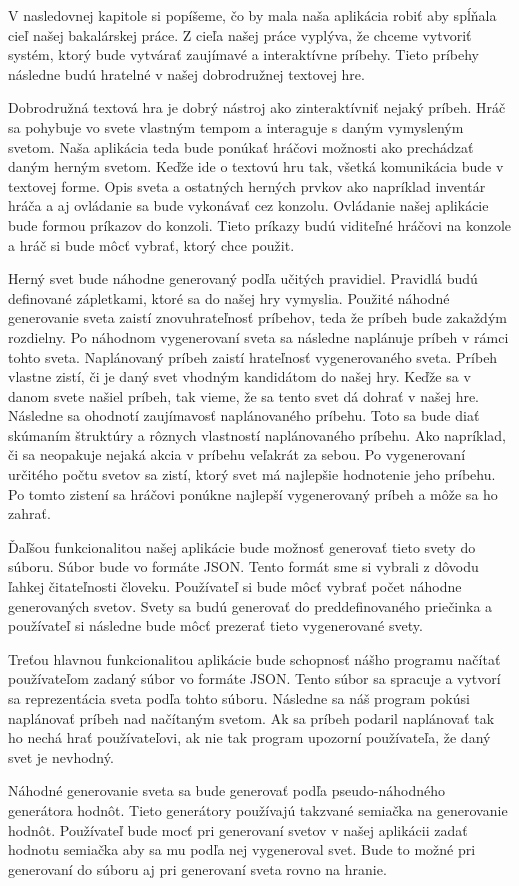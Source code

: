 V nasledovnej kapitole si popíšeme, čo by mala naša aplikácia robiť aby spĺňala cieľ našej bakalárskej práce. Z cieľa našej práce vyplýva, že chceme vytvoriť systém, ktorý bude vytvárať zaujímavé a interaktívne príbehy. Tieto príbehy následne budú hratelné v našej dobrodružnej textovej hre.\par
Dobrodružná textová hra je dobrý nástroj ako zinteraktívniť nejaký príbeh. Hráč sa pohybuje vo svete vlastným tempom a interaguje s daným vymysleným svetom. Naša aplikácia teda bude ponúkať hráčovi možnosti ako prechádzať daným herným svetom. Keďže ide o textovú hru tak, všetká komunikácia bude v textovej forme. Opis sveta a ostatných herných prvkov ako napríklad inventár hráča a aj ovládanie sa bude vykonávať cez konzolu. Ovládanie našej aplikácie bude formou príkazov do konzoli. Tieto príkazy budú viditeľné hráčovi na konzole a hráč si bude môcť vybrať, ktorý chce použit.\par
Herný svet bude náhodne generovaný podľa učitých pravidiel. Pravidlá budú definované zápletkami, ktoré sa do našej hry vymyslia. Použité náhodné generovanie sveta zaistí znovuhrateľnosť príbehov, teda že príbeh bude zakaždým rozdielny. Po náhodnom vygenerovaní sveta sa následne naplánuje príbeh v rámci tohto sveta. Naplánovaný príbeh zaistí hrateľnosť vygenerovaného sveta. Príbeh vlastne zistí, či je daný svet vhodným kandidátom do našej hry. Keďže sa v danom svete našiel príbeh, tak vieme, že sa tento svet dá dohrať v našej hre. Následne sa ohodnotí zaujímavosť naplánovaného príbehu. Toto sa bude diať skúmaním štruktúry a rôznych vlastností naplánovaného príbehu. Ako napríklad, či sa neopakuje nejaká akcia v príbehu veľakrát za sebou. Po vygenerovaní určitého počtu svetov sa zistí, ktorý svet má najlepšie hodnotenie jeho príbehu. Po tomto zistení sa hráčovi ponúkne najlepší vygenerovaný príbeh a môže sa ho zahrať.\par
Ďaľšou funkcionalitou našej aplikácie bude možnosť generovať tieto svety do súboru. Súbor bude vo formáte JSON. Tento formát sme si vybrali z dôvodu ľahkej čitateľnosti človeku. Používateľ si bude môcť vybrať počet náhodne generovaných svetov. Svety sa budú generovať do preddefinovaného priečinka a používateľ si následne bude môcť prezerať tieto vygenerované svety.\par
Treťou hlavnou funkcionalitou aplikácie bude schopnosť nášho programu načítať používateľom zadaný súbor vo formáte JSON. Tento súbor sa spracuje a vytvorí sa reprezentácia sveta podľa tohto súboru. Následne sa náš program pokúsi naplánovať príbeh nad načítaným svetom. Ak sa príbeh podaril naplánovať tak ho nechá hrať používateľovi, ak nie tak program upozorní používateľa, že daný svet je nevhodný.\par
Náhodné generovanie sveta sa bude generovať podľa pseudo-náhodného generátora hodnôt. Tieto generátory používajú takzvané semiačka na generovanie hodnôt. Používateľ bude mocť pri generovaní svetov v našej aplikácii zadať hodnotu semiačka aby sa mu podľa nej vygeneroval svet. Bude to možné pri generovaní do súboru aj pri generovaní sveta rovno na hranie.